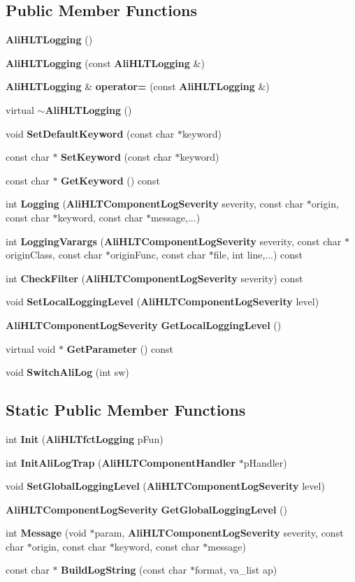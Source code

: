 \subsection*{Public Member Functions}
\begin{CompactItemize}
\item 
{\bf Ali\-HLTLogging} ()
\item 
{\bf Ali\-HLTLogging} (const {\bf Ali\-HLTLogging} \&)
\item 
{\bf Ali\-HLTLogging} \& {\bf operator=} (const {\bf Ali\-HLTLogging} \&)
\item 
virtual {\bf $\sim$Ali\-HLTLogging} ()
\item 
void {\bf Set\-Default\-Keyword} (const char $\ast$keyword)
\item 
const char $\ast$ {\bf Set\-Keyword} (const char $\ast$keyword)
\item 
const char $\ast$ {\bf Get\-Keyword} () const 
\item 
int {\bf Logging} ({\bf Ali\-HLTComponent\-Log\-Severity} severity, const char $\ast$origin, const char $\ast$keyword, const char $\ast$message,...)
\item 
int {\bf Logging\-Varargs} ({\bf Ali\-HLTComponent\-Log\-Severity} severity, const char $\ast$origin\-Class, const char $\ast$origin\-Func, const char $\ast$file, int line,...) const 
\item 
int {\bf Check\-Filter} ({\bf Ali\-HLTComponent\-Log\-Severity} severity) const 
\item 
void {\bf Set\-Local\-Logging\-Level} ({\bf Ali\-HLTComponent\-Log\-Severity} level)
\item 
{\bf Ali\-HLTComponent\-Log\-Severity} {\bf Get\-Local\-Logging\-Level} ()
\item 
virtual void $\ast$ {\bf Get\-Parameter} () const 
\item 
void {\bf Switch\-Ali\-Log} (int sw)
\end{CompactItemize}
\subsection*{Static Public Member Functions}
\begin{CompactItemize}
\item 
int {\bf Init} ({\bf Ali\-HLTfct\-Logging} p\-Fun)
\item 
int {\bf Init\-Ali\-Log\-Trap} ({\bf Ali\-HLTComponent\-Handler} $\ast$p\-Handler)
\item 
void {\bf Set\-Global\-Logging\-Level} ({\bf Ali\-HLTComponent\-Log\-Severity} level)
\item 
{\bf Ali\-HLTComponent\-Log\-Severity} {\bf Get\-Global\-Logging\-Level} ()
\item 
int {\bf Message} (void $\ast$param, {\bf Ali\-HLTComponent\-Log\-Severity} severity, const char $\ast$origin, const char $\ast$keyword, const char $\ast$message)
\item 
const char $\ast$ {\bf Build\-Log\-String} (const char $\ast$format, va\_\-list ap)
\end{CompactItemize}

